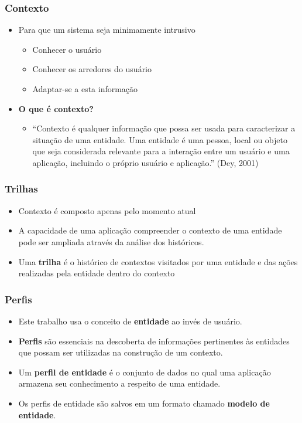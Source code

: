 \documentclass[14pt]{beamer}
\begin{document}
\begin{frame}
  \frametitle{Contexto}
  \begin{itemize}
    \item Para que um sistema seja minimamente intrusivo
    \begin{itemize}
      \item Conhecer o usuário
      \item Conhecer os arredores do usuário
      \item Adaptar-se a esta informação
    \end{itemize}
    \item {\bf O que é contexto?}
    \begin{itemize}
      \item ``Contexto é qualquer informação que possa ser usada para 
      caracterizar a situação de uma entidade. Uma entidade é uma pessoa, 
      local ou objeto que seja considerada relevante para a interação entre 
      um usuário e uma aplicação, incluindo o próprio usuário e aplicação.'' (Dey, 2001)
    \end{itemize}
  \end{itemize}
\end{frame}
    

\begin{frame}
  \frametitle{Trilhas}
  \begin{itemize}
    \item Contexto é composto apenas pelo momento atual
    \item A capacidade de uma aplicação compreender o contexto de uma entidade pode ser ampliada através da análise dos históricos.
    \item Uma \textbf{trilha} é o histórico de contextos visitados por uma entidade e das ações realizadas pela entidade dentro do contexto
  \end{itemize}
\end{frame}
    

\begin{frame}
  \frametitle{Perfis}
    \begin{itemize}
      \item Este trabalho usa o conceito de \textbf{entidade} ao invés de usuário.
      \item \textbf{Perfis} são essenciais na descoberta de informações pertinentes às entidades que possam ser utilizadas na construção de um contexto.
      \item Um \textbf{perfil de entidade} é o conjunto de dados no qual uma aplicação armazena seu conhecimento a respeito de uma entidade. 
      \item Os perfis de entidade são salvos em um formato chamado \textbf{modelo de entidade}.
    \end{itemize}
\end{frame}
    
\end{document}
